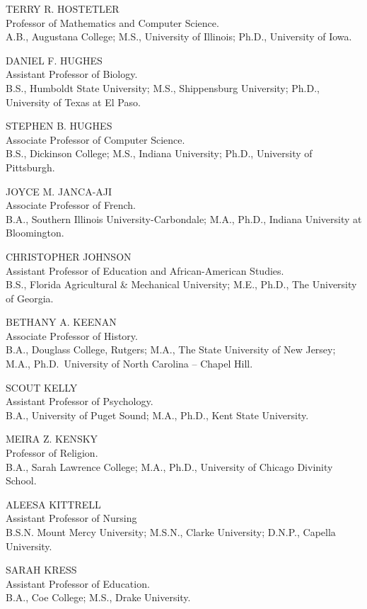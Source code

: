 \documentclass[
  letterpaper,
]{scrbook}
\begin{document}
TERRY R. HOSTETLER\\
Professor of Mathematics and Computer Science.\\
A.B., Augustana College; M.S., University of Illinois; Ph.D., University
of Iowa.

DANIEL F. HUGHES\\
Assistant Professor of Biology.\\
B.S., Humboldt State University; M.S., Shippensburg University; Ph.D.,
University of Texas at El Paso.

STEPHEN B. HUGHES\\
Associate Professor of Computer Science.\\
B.S., Dickinson College; M.S., Indiana University; Ph.D., University of
Pittsburgh.

JOYCE M. JANCA-AJI\\
Associate Professor of French.\\
B.A., Southern Illinois University-Carbondale; M.A., Ph.D., Indiana
University at Bloomington.

CHRISTOPHER JOHNSON\\
Assistant Professor of Education and African-American Studies.\\
B.S., Florida Agricultural \& Mechanical University; M.E., Ph.D., The
University of Georgia.

BETHANY A. KEENAN\\
Associate Professor of History.\\
B.A., Douglass College, Rutgers; M.A., The State University of New
Jersey; M.A., Ph.D.~University of North Carolina -- Chapel Hill.

SCOUT KELLY\\
Assistant Professor of Psychology.\\
B.A., University of Puget Sound; M.A., Ph.D., Kent State University.

MEIRA Z. KENSKY\\
Professor of Religion.\\
B.A., Sarah Lawrence College; M.A., Ph.D., University of Chicago
Divinity School.

ALEESA KITTRELL\\
Assistant Professor of Nursing\\
B.S.N. Mount Mercy University; M.S.N., Clarke University; D.N.P.,
Capella University.

SARAH KRESS\\
Assistant Professor of Education.\\
B.A., Coe College; M.S., Drake University.
\end{document}
